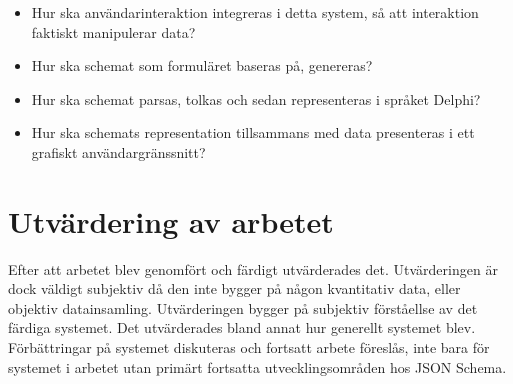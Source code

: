 \begin{itemize}
	\item Hur ska användarinteraktion integreras i detta system, så att interaktion faktiskt manipulerar data?
	\item Hur ska schemat som formuläret baseras på, genereras?
	\item Hur ska schemat parsas, tolkas och sedan representeras i språket Delphi?
	\item Hur ska schemats representation tillsammans med data presenteras i ett grafiskt användargränssnitt?
\end{itemize}

\section{Utvärdering av arbetet}
\label{sec:metod:utvärdering-arbetet}
Efter att arbetet blev genomfört och färdigt utvärderades det. Utvärderingen är dock väldigt subjektiv då den inte bygger på någon kvantitativ data, eller objektiv datainsamling. Utvärderingen bygger på subjektiv förståellse av det färdiga systemet. Det utvärderades bland annat hur generellt systemet blev. Förbättringar på systemet diskuteras och fortsatt arbete föreslås, inte bara för systemet i arbetet utan primärt fortsatta utvecklingsområden hos JSON Schema.